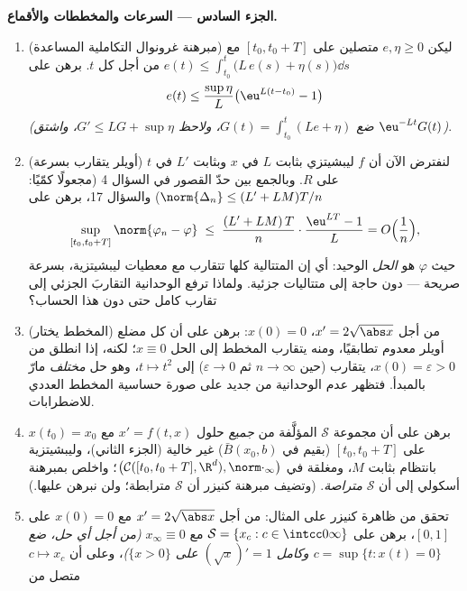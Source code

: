 \begin{problem}[{مسألة نهاية الأسبوع --- وجود حلول المعادلة
$x' = f(t, x)$ دون شرط ليبشيتز}]
\medskip
\noindent\textbf{الجزء السادس --- السرعات والمخططات والأقماع.}
\begin{enumerate}[resume]
  \item (مبرهنة غرونوال التكاملية المساعدة) ليكن $e, \eta \geq 0$
        متصلين على $[t_0, t_0+T]$ مع $e(t) \leq \int_{t_0}
        ^t\bigl(L\,e(s) + \eta(s)\bigr)\dd s$ من أجل كل $t$. برهن
        على
        \[
        e(t) \leq \frac{\sup\eta}{L}\bigl(\eu^{L(t - t_0)} -
        1\bigr)
        \]
        \emph{(ضع $G(t) = \int_{t_0}^t(Le + \eta)$، ولاحظ $G'
        \leq LG + \sup\eta$، واشتق $\eu^{-Lt}G(t)$)}.
  \item (أويلر يتقارب بسرعة) لنفترض الآن أن $f$ ليبشيتزي بثابت
        $L$ في $x$ وبثابت $L'$ في $t$ على $R$. وبالجمع بين حدّ
        القصور في السؤال 4 (مجعولًا كمّيًا: $\norm{\Delta_n} \leq (L' + LM)T/n$) والسؤال 17،
        برهن على
        \[
        \sup_{[t_0, t_0+T]}\norm{\varphi_n - \varphi}
        \;\leq\; \frac{(L' + LM)\,T}{n}\cdot
        \frac{\eu^{LT} - 1}{L} = O\Bigl(\frac1n\Bigr),
        \]
        حيث $\varphi$ هو \emph{الحل} الوحيد: أي إن المتتالية
        كلها تتقارب مع معطيات ليبشيتزية، بسرعة صريحة --- دون
        حاجة إلى متتاليات جزئية. ولماذا ترفع الوحدانية التقاربَ
        الجزئي إلى تقارب كامل حتى دون هذا الحساب؟
  \item (المخطط يختار) من أجل $x' = 2\sqrt{\abs x}$، $x(0) =
        0$: برهن على أن كل
        مضلع أويلر معدوم تطابقيًا، ومنه يتقارب المخطط إلى الحل
        $x \equiv 0$؛ لكنه، إذا انطلق من $x(0) = \varepsilon > 0$، يتقارب (حين
        $n \to \infty$ ثم $\varepsilon \to 0$) إلى $t
        \mapsto t^2$، وهو حل
        \emph{مختلف} مارّ بالمبدأ. فتظهر عدم الوحدانية من جديد
        على صورة حساسية المخطط العددي للاضطرابات.
  \item برهن على أن مجموعة $\mathcal S$ المؤلَّفة من \emph{جميع}
        حلول $x' = f(t,x)$ مع $x(t_0) = x_0$ على $[t_0, t_0+T]$
        (بقيم في $\bar B(x_0, b)$) غير خالية (الجزء الثاني)،
        وليبشيتزية بانتظام بثابت $M$، ومغلقة في $\bigl(\mathcal C([t_0, t_0+T], \R^d),
        \norm\cdot_\infty\bigr)$؛ واخلص
        بمبرهنة أسكولي إلى أن $\mathcal S$ \emph{متراصة}. (وتضيف
        مبرهنة كنيزر أن $\mathcal S$ مترابطة؛ ولن نبرهن عليها.)
  \item تحقق من ظاهرة كنيزر على المثال: من أجل $x' =
        2\sqrt{\abs x}$ مع
        $x(0) = 0$ على $[0, 1]$، برهن على $\mathcal S = \{x_c : c \in \intcc0\infty\}$ مع $x_\infty \equiv 0$
        \emph{(من أجل أي حل، ضع $c =
        \sup\{t : x(t) = 0\}$ وكامل $(\sqrt x)' = 1$
        على $\{x > 0\}$)}، وعلى أن $c \mapsto x_c$ متصل من

\end{enumerate}
\end{problem}
